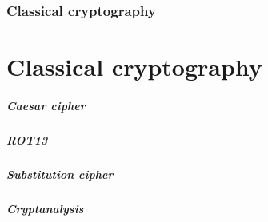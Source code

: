 \section[Section]{Classical cryptography}
\part{Classical cryptography}
\begin{frame}
	\partpage
	\centering
\end{frame}

\begin{frame}
  \frametitle{Caesar cipher}

\end{frame}

\begin{frame}
  \frametitle{ROT13}

\end{frame}

\begin{frame}
  \frametitle{Substitution cipher}

\end{frame}

\begin{frame}
  \frametitle{Cryptanalysis}

  
\end{frame}
